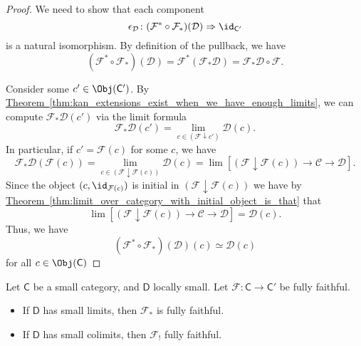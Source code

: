 \documentclass[main.tex]{subfiles}
\begin{document}
\begin{proof}
  We need to show that each component
  \begin{equation*}
    \epsilon_{\mathcal{D}}\colon (\mathcal{F}^{*} \circ \mathcal{F}_{*})(\mathcal{D}) \Rightarrow \id_{\mathsf{C}'}
  \end{equation*}
  is a natural isomorphism. By definition of the pullback, we have
  \begin{equation*}
    (\mathcal{F}^{*} \circ \mathcal{F}_{*})(\mathcal{D}) = \mathcal{F}^{*}(\mathcal{F}_{*}\mathcal{D}) = \mathcal{F}_{*}\mathcal{D} \circ \mathcal{F}.
  \end{equation*}

  Consider some $c' \in \Obj(\mathsf{C}')$. By \hyperref[thm:kan_extensions_exist_when_we_have_enough_limits]{Theorem~\ref*{thm:kan_extensions_exist_when_we_have_enough_limits}}, we can compute $\mathcal{F}_{*}\mathcal{D}(c')$ via the limit formula
  \begin{equation*}
    \mathcal{F}_{*}\mathcal{D}(c') = \lim_{c \in (\mathcal{F} \downarrow c')} \mathcal{D}(c).
  \end{equation*}
  In particular, if $c' = \mathcal{F}(c)$ for some $c$, we have
  \begin{equation*}
    \mathcal{F}_{*}\mathcal{D}(\mathcal{F}(c)) = \lim_{c \in (\mathcal{F} \downarrow \mathcal{F}(c))} \mathcal{D}(c) = \lim\left[ (\mathcal{F} \downarrow \mathcal{F}(c)) \to \mathcal{C} \to \mathcal{D} \right].
  \end{equation*}
  Since the object $(c, \id_{\mathcal{F}(c)})$ is initial in $(\mathcal{F} \downarrow \mathcal{F}(c))$ we have by \hyperref[thm:limit_over_category_with_initial_object_is_that]{Theorem~\ref*{thm:limit_over_category_with_initial_object_is_that}} that
  \begin{equation*}
    \lim\left[ (\mathcal{F} \downarrow \mathcal{F}(c)) \to \mathcal{C} \to \mathcal{D} \right] = \mathcal{D}(c).
  \end{equation*}
  Thus, we have
  \begin{equation*}
    (\mathcal{F}^{*} \circ \mathcal{F}_{*})(\mathcal{D})(c) \simeq \mathcal{D}(c)
  \end{equation*}
  for all $c \in \Obj(\mathsf{C})$
\end{proof}

\begin{corollary}
  Let $\mathsf{C}$ be a small category, and $\mathsf{D}$ locally small. Let $\mathcal{F}\colon \mathsf{C} \to \mathsf{C'}$ be fully faithful.
  \begin{itemize}
    \item If $\mathsf{D}$ has small limits, then $\mathcal{F}_{*}$ is fully faithful.

    \item If $\mathsf{D}$ has small colimits, then $\mathcal{F}_{!}$ fully faithful.
  \end{itemize}
\end{corollary}
\end{document}
